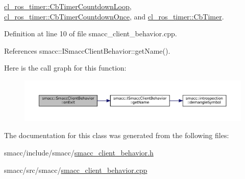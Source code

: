 \hyperlink{classcl__ros__timer_1_1CbTimerCountdownLoop_a5623e9fdd8f0fb23e8707f7816c099d6}{cl\+\_\+ros\+\_\+timer\+::\+Cb\+Timer\+Countdown\+Loop}, \hyperlink{classcl__ros__timer_1_1CbTimerCountdownOnce_ab602b778a299b42e8cc9f4bf3da0a234}{cl\+\_\+ros\+\_\+timer\+::\+Cb\+Timer\+Countdown\+Once}, and \hyperlink{classcl__ros__timer_1_1CbTimer_a04184e2679c32363c876e1d6b4746072}{cl\+\_\+ros\+\_\+timer\+::\+Cb\+Timer}.



Definition at line 10 of file smacc\+\_\+client\+\_\+behavior.\+cpp.



References smacc\+::\+I\+Smacc\+Client\+Behavior\+::get\+Name().


Here is the call graph for this function\+:
\nopagebreak
\begin{figure}[H]
\begin{center}
\leavevmode
\includegraphics[width=350pt]{classsmacc_1_1SmaccClientBehavior_a7e4fb6ce81ff96dc172425852d69c0c5_cgraph}
\end{center}
\end{figure}


The documentation for this class was generated from the following files\+:\begin{DoxyCompactItemize}
\item 
smacc/include/smacc/\hyperlink{smacc__client__behavior_8h}{smacc\+\_\+client\+\_\+behavior.\+h}\item 
smacc/src/smacc/\hyperlink{smacc__client__behavior_8cpp}{smacc\+\_\+client\+\_\+behavior.\+cpp}\end{DoxyCompactItemize}
